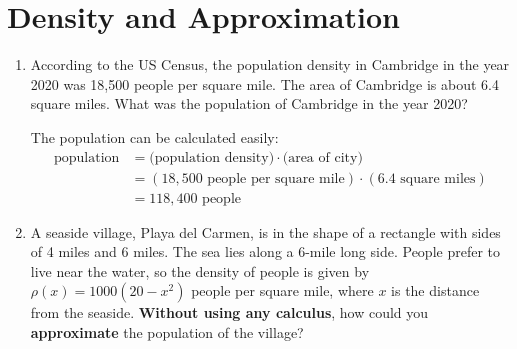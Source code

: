 \documentclass[main]{subfiles}
\begin{document}
\ifSubfilesClassLoaded{%
  \chaptermark{\chapterone}
}{}

\section{Density and Approximation} \label{ws1-1}

\begin{enumerate}
\item  \label{constant-density-warmup}


\begin{problem}[0.5in]
    According to the US Census, the population density in Cambridge in the year 2020 was 18,500 people 
    per square mile. The area of Cambridge is about 6.4 square miles. What was the population of
Cambridge in the year 2020?
  \end{problem}

  \begin{solution}
    The population can be calculated easily:
    \begin{align*}
      \textrm{population} &= \textrm{(population density)} \cdot \textrm{(area
        of city)} \\ 
      & = (18,500 \textrm{ people per square mile}) \cdot
      (6.4 \textrm{ square miles}) \\
      & = \boxed{118,400 \textrm{ people}}
    \end{align*}
  \end{solution}

  
\item  \label{density-rectangle-1}

  
  \begin{problem}[\vfill]
    A seaside village, Playa del Carmen, is in the shape of a rectangle
    with sides of 4 miles and 6 miles.  The sea lies along a 6-mile long
    side.  People prefer to live near the water, so the density of people
    is given by $\rho(x) = 1000 (20 - x^2)$ people per square mile, where
    $x$ is the distance from the seaside.  \textbf{Without using any
      calculus}, how could you \textbf{approximate} the population of the
    village?
  \end{problem}


\end{enumerate}
\end{document}
